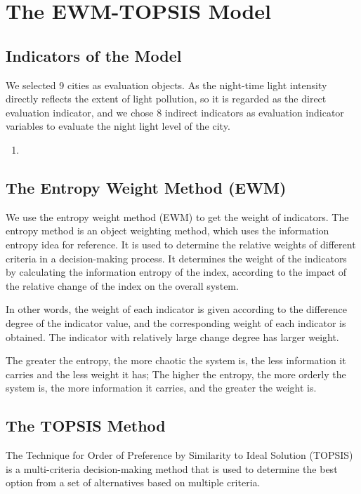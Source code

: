 \MinParskip{}

\section{The EWM-TOPSIS Model}

\subsection{Indicators of the Model}
We selected 9 cities as evaluation objects. As the night-time light intensity directly reflects the extent of light pollution, so it is regarded as the direct evaluation indicator, and we chose 8 indirect indicators as evaluation indicator variables to evaluate the night light level of the city.
\begin{enumerate}
    \item 
\end{enumerate}

\subsection{The Entropy Weight Method (EWM) }
We use the entropy weight method (EWM) to get the weight of indicators. The entropy method is an object weighting method, which uses the information entropy idea for reference. It is used to determine the relative weights of different criteria in a decision-making process. It determines the weight of the indicators by calculating the information entropy of the index, according to the impact of the relative change of the index on the overall system.

In other words, the weight of each indicator is given according to the difference degree of the indicator value, and the corresponding weight of each indicator is obtained. The indicator with relatively large change degree has larger weight. 

The greater the entropy, the more chaotic the system is, the less information it carries and the less weight it has; The higher the entropy, the more orderly the system is, the more information it carries, and the greater the weight is.

\subsection{The TOPSIS Method}
The Technique for Order of Preference by Similarity to Ideal Solution (TOPSIS) is a multi-criteria decision-making method that is used to determine the best option from a set of alternatives based on multiple criteria. 


